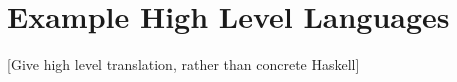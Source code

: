 \section{Example High Level Languages}


[Give high level translation, rather than concrete Haskell]
